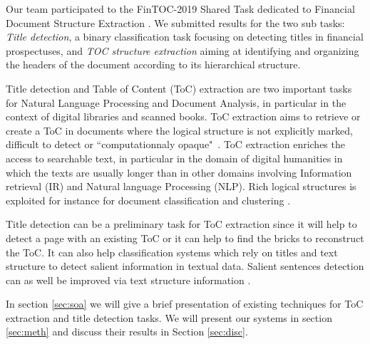 Our team participated to the FinTOC-2019 Shared Task dedicated to Financial Document Structure Extraction \cite{juge2019fintoc}. We submitted results for the two sub tasks:  \emph{Title detection}, a binary classification task focusing on detecting titles in financial prospectuses, and \emph{TOC structure extraction} aiming at identifying and organizing the headers of the document according to its hierarchical structure.

 Title detection and Table of Content (ToC) extraction are two important tasks for Natural Language Processing and Document Analysis, in particular in the context of digital libraries and scanned books.
ToC extraction aims to retrieve or create a ToC in documents where the logical structure is not explicitly marked, difficult to detect or ``computationnaly opaque"~\cite{DeBusser-2006a}.
  ToC extraction enriches the access to searchable text, in particular in the domain of digital humanities in which the texts are usually longer than in other domains involving Information retrieval (IR) and Natural language Processing (NLP).
Rich logical structures is exploited for instance for document classification and clustering \cite{Doucet-2006a,Elhadj-2012}.

 Title detection can be a preliminary task for ToC extraction since it will help to detect a page with an existing ToC or it can help to find the bricks to reconstruct the ToC. It can also help classification systems which rely on titles and text structure to detect salient information in textual data\cite{Lejeune-2015}. Salient sentences detection can as well be improved via text structure information \cite{Denil-2015}.
 
  In section \ref{sec:soa} we will give a brief presentation of existing techniques for ToC extraction and title detection tasks. We will present our systems in section \ref{sec:meth} and discuss their results in Section \ref{sec:disc}.
 